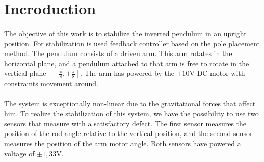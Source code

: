 \documentclass{article}
\begin{document}

\setlength{\parindent}{4em}
\setlength{\parskip}{1em}
\renewcommand{\baselinestretch}{2.0}


\section{Incroduction}


\paragraph{}
The objective of this work is to stabilize the inverted pendulum in an upright position. For stabilization is used feedback controller based on the pole placement method. The pendulum consists of a driven arm. This arm rotates in the horizontal plane, and a pendulum attached to that arm is free to rotate in the vertical plane $[-\frac{\pi}{8}, +\frac{\pi}{8}]$. The arm has powered by the $\pm \si{10\volt}$ DC motor with constraints movement around. 
\paragraph{}
The system is exceptionally non-linear due to the gravitational forces that affect him. To realize the stabilization of this system, we have the possibility to use two sensors that measure with a satisfactory defect. The first sensor measures the position of the rod angle relative to the vertical position, and the second sensor measures the position of the arm motor angle. Both sensors have powered a voltage of $\pm \si{1,33\volt}$.
 
\end{document}
